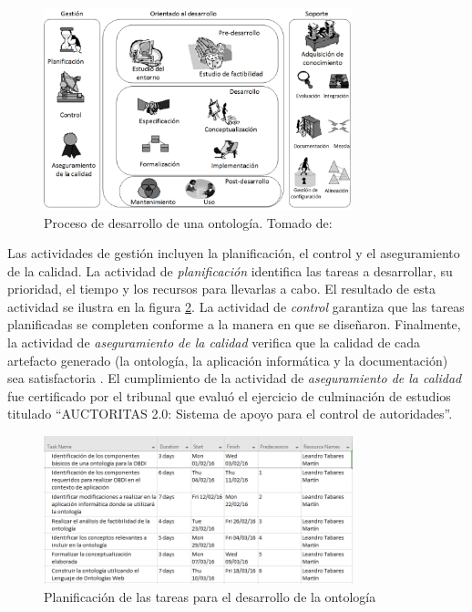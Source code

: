 \begin{figure}
\begin{center}
	\includegraphics[width=0.8\textwidth]{img/Diagrama_METHONTOLOGY.png}
\end{center}
\caption{Proceso de desarrollo de una ontología. Tomado de: \citep{Gomez-Perez:2007:OEE:1199560}}
\label{fig: methontology}
\end{figure}

Las actividades de gestión incluyen la planificación, el control y el aseguramiento de la calidad. La actividad de \textit{planificación} identifica las tareas a desarrollar, su prioridad, el tiempo y los recursos para llevarlas a cabo. El resultado de esta actividad se ilustra en la figura \ref{fig: planificacion}. La actividad de \textit{control} garantiza que las tareas planificadas se completen conforme a la manera en que se diseñaron. Finalmente, la actividad de \textit{aseguramiento de la calidad} verifica que la calidad de cada artefacto generado (la ontología, la aplicación informática y la documentación) sea satisfactoria \citep{Gomez-Perez:2007:OEE:1199560}. El cumplimiento de la actividad de \textit{aseguramiento de la calidad} fue certificado por el tribunal que evaluó el ejercicio de culminación de estudios titulado ``AUCTORITAS 2.0: Sistema de apoyo para el control de autoridades''.

\begin{figure}
\begin{center}
	\includegraphics[width=0.8\textwidth]{img/planificacionTareas.PNG}
\end{center}
\caption{Planificación de las tareas para el desarrollo de la ontología}
\label{fig: planificacion}
\end{figure}

